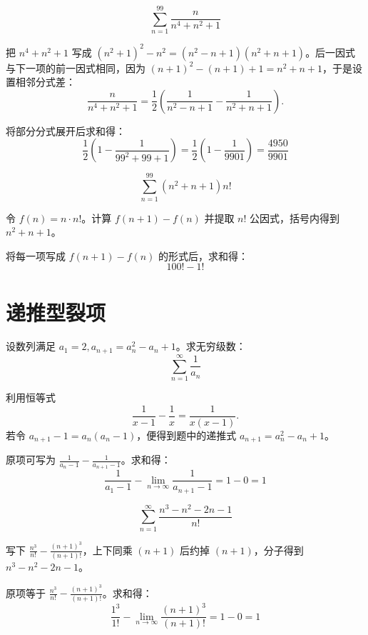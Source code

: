 \begin{example}[$\displaystyle \sum_{n=1}^{99} \frac{n}{n^4+n^2+1}$]
\[\displaystyle \sum_{n=1}^{99} \frac{n}{n^4+n^2+1}\]
\end{example}
\begin{solution}
把 \(n^4 + n^2 + 1\) 写成 \((n^2+1)^2 - n^2 = (n^2-n+1)(n^2+n+1)\)。后一因式与下一项的前一因式相同，因为 \((n+1)^2 - (n+1) + 1 = n^2+n+1\)，于是设置相邻分式差：
\[
\frac{n}{n^4+n^2+1} = \frac{1}{2}\left(\frac{1}{n^2-n+1}-\frac{1}{n^2+n+1}\right).
\]

将部分分式展开后求和得：
\[
\frac{1}{2} \left(1 - \frac{1}{99^2 + 99 + 1}\right) = \frac{1}{2} \left(1 - \frac{1}{9901}\right) = \frac{4950}{9901}
\]

\end{solution}

\begin{example}[$\displaystyle \sum_{n=1}^{99} (n^2+n+1)n!$]
\[\displaystyle \sum_{n=1}^{99} (n^2+n+1)n!\]
\end{example}
\begin{solution}
令 \(f(n)=n\cdot n!\)。计算 \(f(n+1)-f(n)\) 并提取 \(n!\) 公因式，括号内得到 \(n^2+n+1\)。

将每一项写成 \(f(n+1)-f(n)\) 的形式后，求和得：
\[
100! - 1!
\]

\end{solution}

\section{递推型裂项}

\begin{example}
设数列满足 \(a_1=2, a_{n+1}=a_n^2-a_n+1\)。求无穷级数：
\[\displaystyle \sum_{n=1}^{\infty} \frac{1}{a_n}\]
\end{example}
\begin{solution}
利用恒等式
\[
\frac{1}{x-1}-\frac{1}{x}=\frac{1}{x(x-1)}.
\]
若令 \(a_{n+1}-1=a_n(a_n-1)\)，便得到题中的递推式 \(a_{n+1}=a_n^2-a_n+1\)。

原项可写为 \(\frac{1}{a_n-1} - \frac{1}{a_{n+1}-1}\)。求和得：
\[
\frac{1}{a_1-1} - \lim_{n\to\infty} \frac{1}{a_{n+1}-1} = 1 - 0 = 1
\]

\end{solution}

\begin{example}
   $$ \sum_{n=1}^{\infty} \frac{n^3-n^2-2n-1}{n!} $$
\end{example}
\begin{solution}
写下 \( \frac{n^3}{n!} - \frac{(n+1)^3}{(n+1)!} \)，上下同乘 \((n+1)\) 后约掉 \((n+1)\)，分子得到 \(n^3-n^2-2n-1\)。

原项等于 \( \frac{n^3}{n!} - \frac{(n+1)^3}{(n+1)!} \)。求和得：
\[
\frac{1^3}{1!} - \lim_{n\to\infty} \frac{(n+1)^3}{(n+1)!} = 1 - 0 = 1
\]

\end{solution}

